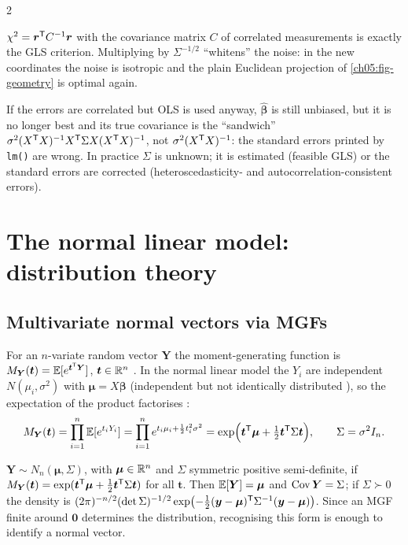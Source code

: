 \begin{paracol}{2}
\begin{intuition}[Whitening]
$\chi^2=\bm r^{\mathsf T} C^{-1}\bm r$ with the covariance matrix $C$ of correlated measurements is exactly the GLS criterion.
Multiplying by $\Sigma^{-1/2}$ ``whitens'' the noise: in the new coordinates the noise is isotropic and the plain
Euclidean projection of \cref{ch05:fig-geometry} is optimal again.
\end{intuition}

\begin{remark}
If the errors are correlated but OLS is used anyway, $\hat{\bm\beta}$ is still unbiased, but it is no longer best and its
true covariance is the ``sandwich'' $\sigma^2(X^{\mathsf T} X)^{-1}X^{\mathsf T}\Sigma X(X^{\mathsf T} X)^{-1}$, not $\sigma^2(X^{\mathsf T} X)^{-1}$: the standard
errors printed by \texttt{lm()} are wrong. In practice $\Sigma$ is unknown; it is estimated (feasible GLS) or the
standard errors are corrected (heteroscedasticity- and autocorrelation-consistent errors).
\end{remark}

\section{The normal linear model: distribution theory}\label{ch05:sec-normal}

\subsection{Multivariate normal vectors via MGFs}
For an $n$-variate random vector $\bm Y$ the moment-generating function is $M_{\bm Y}(\bm t)=\mathbb{E}[e^{\bm t^{\mathsf T}\bm Y}]$,
$\bm t\in\mathbb{R}^n$ . In the normal linear model the $Y_i$ are independent $N(\mu_i,\sigma^2)$ with
$\bm\mu=X\bm\beta$ (independent but not identically distributed ), so the expectation of the product
factorises  :
\[
  M_{\bm Y}(\bm t)=\prod_{i=1}^n\mathbb{E}[e^{t_iY_i}]=\prod_{i=1}^ne^{t_i\mu_i+\frac12t_i^2\sigma^2}
  =\exp\Bigl(\bm t^{\mathsf T}\bm\mu+\tfrac12\bm t^{\mathsf T}\Sigma\bm t\Bigr),\qquad \Sigma=\sigma^2I_n .
\]

\begin{definition}\label{ch05:def-mvn}
$\bm Y\sim N_n(\bm\mu,\Sigma)$, with $\bm\mu\in\mathbb{R}^n$ and $\Sigma$ symmetric positive semi-definite, if
$M_{\bm Y}(\bm t)=\exp(\bm t^{\mathsf T}\bm\mu+\frac12\bm t^{\mathsf T}\Sigma\bm t)$ for all $\bm t$. Then $\mathbb{E}[\bm Y]=\bm\mu$ and $\operatorname{Cov}\bm Y=\Sigma$; if
$\Sigma\succ0$ the density is $(2\pi)^{-n/2}(\det\Sigma)^{-1/2}\exp\bigl(-\frac12(\bm y-\bm\mu)^{\mathsf T}\Sigma^{-1}(\bm y-\bm\mu)\bigr)$. Since an MGF
finite around $\bm 0$ determines the distribution, recognising this form is enough to identify a normal vector.
\end{definition}


\end{paracol}
